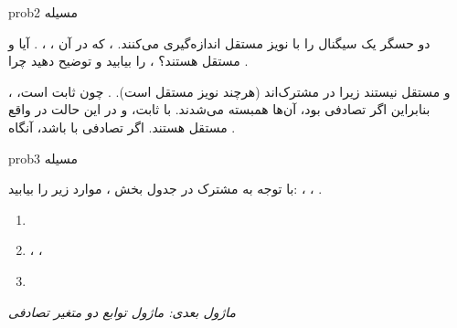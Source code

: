 \begin{PSbox}[unbreakable]{prob}{مسیله 2}

دو حسگر یک سیگنال را با نویز مستقل اندازه‌گیری می‌کنند. ،  که در آن ، ، . آیا  و  مستقل هستند؟ ،  را بیابید و توضیح دهید چرا .

\PSsolution{}  و  مستقل نیستند زیرا در  مشترک‌اند (هرچند نویز مستقل است). . چون  ثابت است، ، بنابراین اگر  تصادفی بود، آن‌ها همبسته می‌شدند. با  ثابت،  و  در این حالت در واقع مستقل هستند. اگر  تصادفی با  باشد، آنگاه .

\end{PSbox}

\begin{PSbox}[unbreakable]{prob}{مسیله 3}

با توجه به  مشترک در جدول بخش ، موارد زیر را بیابید: ، ، .

\PSsolution{} 

\begin{enumerate}
\def\labelenumi{(\alph{enumi})}
\tightlist
\item
\item
  ، ، 
\item
\end{enumerate}

\emph{ماژول بعدی: {ماژول  توابع دو متغیر تصادفی}}\PSbr{}

\end{PSbox}
